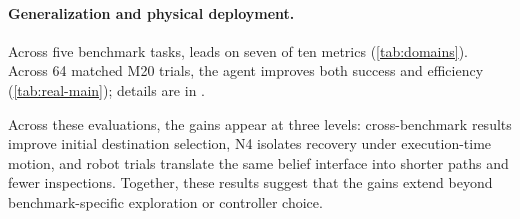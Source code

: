 \noindent\begin{minipage}[t]{0.34\linewidth}
\vspace{0pt}
\paragraph{Generalization and physical deployment.}
Across five benchmark tasks, \evolvingworldnav{} leads on seven of ten metrics (\cref{tab:domains}).
Across 64 matched M20 trials, the agent improves both success and
efficiency (\cref{tab:real-main}); details are in .
\end{minipage}\hfill
\begin{minipage}[t]{0.63\linewidth}
\vspace{0pt}
\label{tab:real-main}
\centering
\scriptsize
\setlength{\tabcolsep}{2.2pt}
\end{minipage}\par\medskip

Across these evaluations, the gains appear at three levels: cross-benchmark
results improve initial destination selection, N4 isolates recovery under
execution-time motion, and robot trials translate the same belief interface
into shorter paths and fewer inspections. Together, these results suggest that the gains extend beyond
benchmark-specific exploration or controller choice.

